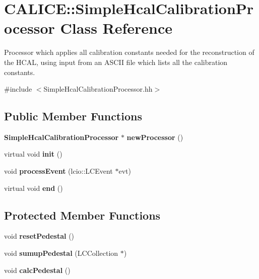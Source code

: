 \section{CALICE::SimpleHcalCalibrationProcessor Class Reference}
\label{classCALICE_1_1SimpleHcalCalibrationProcessor}


Processor which applies all calibration constants needed for the reconstruction of the HCAL, using input from an ASCII file which lists all the calibration constants.  


{\ttfamily \#include $<$SimpleHcalCalibrationProcessor.hh$>$}\subsection*{Public Member Functions}
\begin{DoxyCompactItemize}
\item 
{\bf SimpleHcalCalibrationProcessor} $\ast$ {\bfseries newProcessor} ()\label{classCALICE_1_1SimpleHcalCalibrationProcessor_a1682beed2fe00351f65858cbaf7ac0fa}

\item 
virtual void {\bfseries init} ()\label{classCALICE_1_1SimpleHcalCalibrationProcessor_a2f394a288da039ef7209457ec028b858}

\item 
void {\bfseries processEvent} (lcio::LCEvent $\ast$evt)\label{classCALICE_1_1SimpleHcalCalibrationProcessor_a91d98edae41d16b962f5acf420d0c898}

\item 
virtual void {\bfseries end} ()\label{classCALICE_1_1SimpleHcalCalibrationProcessor_ada5724ec6026eb8289567ccbcfdd0ed8}

\end{DoxyCompactItemize}
\subsection*{Protected Member Functions}
\begin{DoxyCompactItemize}
\item 
void {\bfseries resetPedestal} ()\label{classCALICE_1_1SimpleHcalCalibrationProcessor_aadf1394fe327966a3699ff0bbdfc2142}

\item 
void {\bfseries sumupPedestal} (LCCollection $\ast$)\label{classCALICE_1_1SimpleHcalCalibrationProcessor_ab943f16a6b695d16f806a5d91f4c8176}

\item 
void {\bfseries calcPedestal} ()\label{classCALICE_1_1SimpleHcalCalibrationProcessor_aec0a7d9911db467b754a4ab79060868b}

\end{DoxyCompactItemize}
